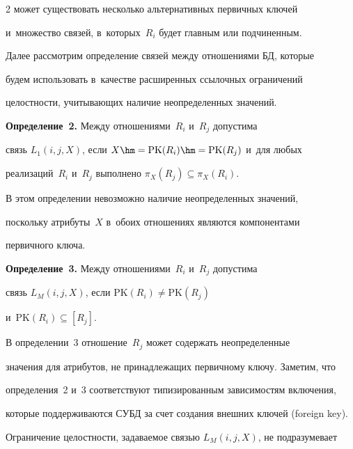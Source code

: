 \begin{multicols}{2}
может существовать несколько альтернативных первичных ключей

и~множество связей, в~которых~$R_i$ будет главным или подчиненным.



  Далее рассмотрим определение связей между отношениями БД, которые

будем использовать в~качестве расширенных ссылочных ограничений

целостности, учитывающих наличие неопределенных значений.





  \smallskip



  \noindent

  \textbf{Определение~2.} Между отношениями~$R_i$ и~$R_j$ допустима

связь $L_1(i,j,X)$, если $X\hm= \mathrm{PK}(R_i) \hm= \mathrm{PK}(R_j)$ и~для любых

реализаций~$R_i$ и~$R_j$ выполнено $\pi_X(R_j)\subseteq \pi_X(R_i)$.





  В этом определении невозможно наличие неопределенных значений,

поскольку атрибуты~$X$ в~обоих отношениях являются компонентами

первичного ключа.



  \smallskip



  \noindent

  \textbf{Определение~3.} Между отношениями~$R_i$ и~$R_j$ допустима

связь $L_M(i,j,X)$, если $\mathrm{PK}(R_i)\not= \mathrm{PK}(R_j)$ 

и~$\mathrm{PK}(R_i)\subseteq [R_j]$.



  \smallskip



  В определении~3 отношение~$R_j$ может содержать неопределенные

значения для атрибутов, не принадлежащих первичному ключу. Заметим, что

определения~2 и~3 соответствуют типизированным зависимостям включения,

которые поддерживаются СУБД за счет создания внешних ключей (foreign key).

Ограничение целостности, задаваемое связью $L_M(i,j,X)$, не подразумевает


\end{multicols}
